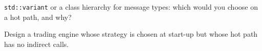 \begin{interviewq}\label{iq:ll:cpp-for-latency-ii-compile-time:5}
\texttt{std::variant} or a class hierarchy for message types: which would you choose on a hot path, and why?
\end{interviewq}

\begin{interviewq}\label{iq:ll:cpp-for-latency-ii-compile-time:6}
Design a trading engine whose strategy is chosen at start-up but whose hot path has no indirect calls.
\end{interviewq}

